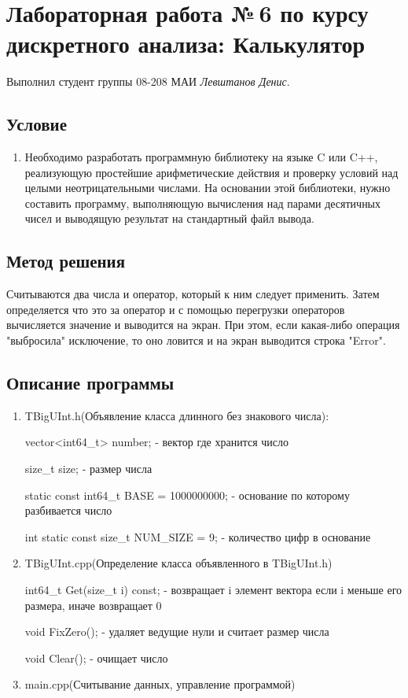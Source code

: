 \documentclass[12pt]{article}
\begin{document}
\section*{Лабораторная работа №\,6 по курсу дискретного анализа: Калькулятор}

Выполнил студент группы 08-208 МАИ \textit{Левштанов Денис}.

\subsection*{Условие}

\begin{enumerate}
\item Необходимо разработать программную библиотеку на языке C или C++, реализующую простейшие арифметические действия и проверку условий над целыми неотрицательными числами. На основании этой библиотеки, нужно составить программу, выполняющую вычисления над парами десятичных чисел и выводящую результат на стандартный файл вывода.

\end{enumerate}

\subsection*{Метод решения}
\par Считываются два числа и оператор, который к ним следует применить. Затем определяется что это за оператор и с помощью перегрузки операторов вычисляется значение и выводится на экран. При этом, если какая-либо операция "выбросила" исключение, то оно ловится и на экран выводится строка "Error".

\subsection*{Описание программы}

\begin{enumerate}
\item TBigUInt.h(Объявление класса длинного без знакового числа):
\par vector<int64\_t> number; - вектор где хранится число
\par size\_t size; - размер числа
\par static const int64\_t BASE = 1000000000; - основание по которому разбивается число
\par int static const size\_t NUM\_SIZE = 9; - количество цифр в основание
\item TBigUInt.cpp(Определение класса объявленного в TBigUInt.h)
\par int64\_t Get(size\_t i) const; - возвращает i элемент вектора если i меньше его размера, иначе возвращает 0
\par void FixZero(); - удаляет ведущие нули и считает размер числа
\par void Clear(); - очищает число
\item main.cpp(Считывание данных, управление программой)
\end{enumerate}
\end{document}
